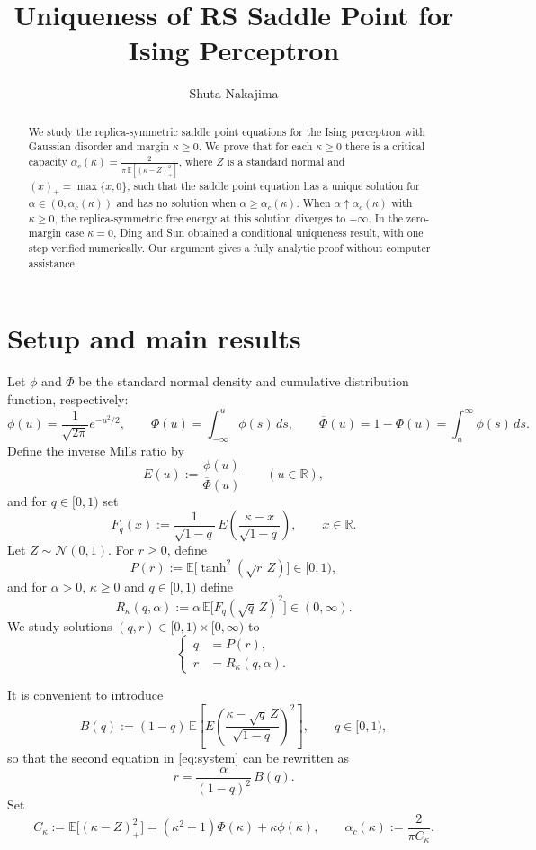 \documentclass[11pt]{article}
\title{Uniqueness of RS Saddle Point for Ising Perceptron}
\author{Shuta Nakajima}
\affil{Department of Mathematics, Keio University}
\date{}
\begin{document}
\maketitle


\begin{abstract}
We study the replica-symmetric saddle point equations for the Ising perceptron with Gaussian disorder and margin $\kappa\ge 0$. We prove that for each $\kappa\ge 0$ there is a critical capacity
$\alpha_c(\kappa)=\frac{2}{\pi\,\mathbb E[(\kappa-Z)_+^2]}$,
where $Z$ is a standard normal and $(x)_+=\max\{x,0\}$, such that the saddle point equation has a unique solution for $\alpha\in(0,\alpha_c(\kappa))$ and has no solution when $\alpha\ge \alpha_c(\kappa)$.
When $\alpha\uparrow \alpha_c(\kappa)$ with $\kappa\geq 0$, the replica-symmetric free energy at this solution  diverges to $-\infty$.
In the zero-margin case $\kappa=0$, Ding and Sun obtained a conditional uniqueness result, with one step verified numerically. Our argument gives a fully analytic proof without computer assistance.
\end{abstract}

\section{Setup and main results}

Let $\phi$ and $\Phi$ be the standard normal density and cumulative distribution function, respectively:
\[
\phi(u)=\frac{1}{\sqrt{2\pi}}e^{-u^2/2},
\qquad
\Phi(u)=\int_{-\infty}^u \phi(s)\,ds,
\qquad
\overline{\Phi}(u)=1-\Phi(u)=\int_u^{\infty}\phi(s)\,ds.
\]
Define the inverse Mills ratio by 
\[
E(u):=\frac{\phi(u)}{\overline{\Phi}(u)}\qquad (u\in\mathbb R),
\]
and for $q\in[0,1)$ set
\[
F_q(x):=\frac{1}{\sqrt{1-q}}\,E\!\left(\frac{\kappa-x}{\sqrt{1-q}}\right),\qquad x\in\mathbb R.
\]
Let $Z\sim\mathcal N(0,1)$. For $r\ge 0$, define
\[
P(r):=\mathbb E\big[\tanh^2(\sqrt{r}\,Z)\big]\in[0,1),
\]
and for $\alpha>0,\,\kappa\geq 0$ and $q\in[0,1)$ define
\[
R_{\kappa}(q,\alpha):=\alpha\,\mathbb E\big[F_q(\sqrt{q}\,Z)^2\big]\in(0,\infty).
\]
We study solutions $(q,r)\in[0,1)\times[0,\infty)$ to
\begin{equation}\label{eq:system}
\left\{
\begin{aligned}
q&=P(r),\\
r&=R_{\kappa}(q,\alpha).
\end{aligned}
\right.
\end{equation}

It is convenient to introduce
\begin{equation}\label{eq:defB}
B(q):=(1-q)\,\mathbb E\left[E\!\left(\frac{\kappa-\sqrt{q}\,Z}{\sqrt{1-q}}\right)^2\right],\qquad q\in[0,1),
\end{equation}
so that the second equation in \eqref{eq:system} can be rewritten as
\begin{equation}\label{eq:r_in_terms_of_B}
r=\frac{\alpha}{(1-q)^2}\,B(q).
\end{equation}
Set
\[
C_{\kappa}:=\mathbb E\big[(\kappa-Z)_+^2\big]=(\kappa^2+1)\Phi(\kappa)+\kappa\phi(\kappa),
\qquad
\alpha_c(\kappa):=\frac{2}{\pi C_{\kappa}}.
\]
\end{document}
